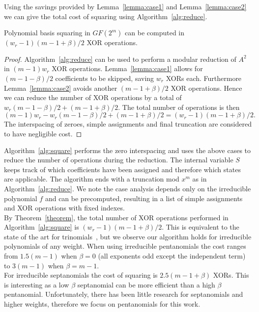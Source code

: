 \vspace{2mm}

Using the savings provided by Lemma~\ref{lemma:case1} and Lemma~\ref{lemma:case2} we can give the total cost of squaring using Algorithm~\ref{alg:reduce}.

\begin{thm} \label{theorem}
Polynomial basis squaring in $GF(2^m)$ can be computed in $(w_r-1) (m-1+\beta)/2$ XOR operations.
\end{thm}

\begin{proof}
    Algorithm~\ref{alg:reduce} can be used to perform a modular reduction of $A^2$ in $(m-1)w_r$ XOR operations. Lemma~\ref{lemma:case1} allows for $(m-1-\beta)/2$ coefficients to be skipped, saving $w_r$ XORs each. Furthermore Lemma~\ref{lemma:case2} avoids another $(m-1+\beta)/2$ XOR operations. Hence we can reduce the number of XOR operations by a total of $w_r (m-1-\beta)/2 + (m-1+\beta)/2$. The total number of operations is then $$(m-1)w_r - w_r (m-1-\beta)/2 + (m-1+\beta)/2 = (w_r-1) (m-1+\beta)/2.$$ The interspacing of zeroes, simple assignments and final truncation are considered to have negligible cost.
\end{proof}

Algorithm~\ref{alg:square} performs the zero interspacing and uses the above cases to reduce the number of operations during the reduction. The internal variable $S$ keeps track of which coefficients have been assigned and therefore which states are applicable. The algorithm ends with a truncation mod $x^m$ as in Algorithm~\ref{alg:reduce}. We note the case analysis depends only on the irreducible polynomial $f$ and can be precomputed, resulting in a list of simple assignments and XOR operations with fixed indexes. \\

By Theorem~\ref{theorem}, the total number of XOR operations performed in Algorithm~\ref{alg:square} is $(w_r-1) (m-1+\beta)/2$. This is equivalent to the state of the art for trinomials~\cite{wu2002bit}, but we observe our algorithm holds for irreducible polynomials of any weight. When using irreducible pentanomials the cost ranges from $1.5(m-1)$ when $\beta=0$ (all exponents odd except the independent term) to $3(m-1)$ when $\beta=m-1$. \\

For irreducible septanomials the cost of squaring is $2.5(m-1+\beta)$ XORs. This is interesting as a low $\beta$ septanomial can be more efficient than a high $\beta$ pentanomial. Unfortunately, there has been little research for septanomials and higher weights, therefore we focus on pentanomials for this work. \\

